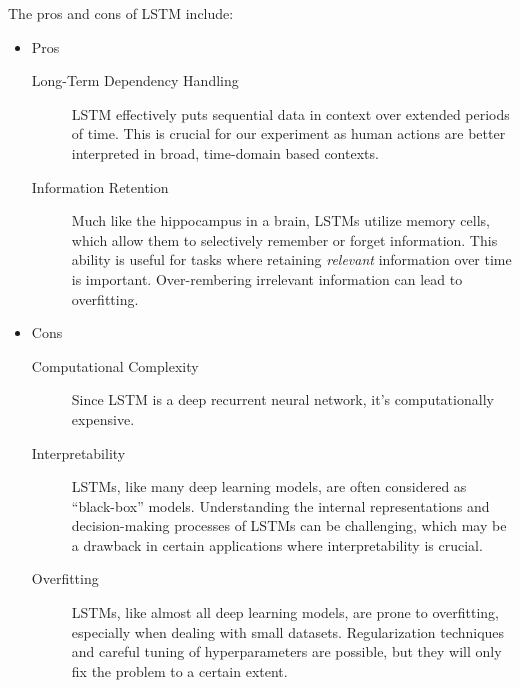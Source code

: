 \documentclass[letterpaper]{article} %
\begin{document}
The pros and cons of LSTM include:
\begin{itemize}
  \item Pros
  \begin{description}
    \item[Long-Term Dependency Handling]
      LSTM effectively puts sequential data in context
      over extended periods of time.
      This is crucial for our experiment
      as human actions are better interpreted
      in broad, time-domain based contexts.
    \item[Information Retention]
      Much like the hippocampus in a brain, 
      LSTMs utilize memory cells, which allow them to 
      selectively remember or forget information. 
      This ability is useful for tasks where 
      retaining \emph{relevant} information over time is important.
      Over-rembering irrelevant information can lead to overfitting.
  \end{description} 
  \item Cons
  \begin{description}
    \item[Computational Complexity]
      Since LSTM is a deep recurrent neural network,
      it's computationally expensive.
    \item[Interpretability]
      LSTMs, like many deep learning models, 
      are often considered as ``black-box'' models. 
      Understanding the internal representations and 
      decision-making processes of LSTMs can be challenging, 
      which may be a drawback in certain applications where interpretability is crucial.
    \item[Overfitting]
      LSTMs, like almost all deep learning models, 
      are prone to overfitting, especially when dealing with small datasets. 
      Regularization techniques and careful tuning of hyperparameters are possible,
      but they will only fix the problem to a certain extent.
  \end{description} 
\end{itemize}
\end{document}
